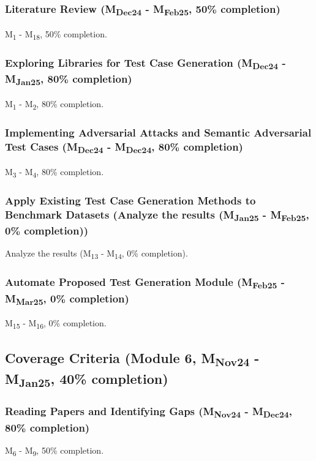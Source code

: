 \subsubsection{Literature Review (M\textsubscript{Dec24} - M\textsubscript{Feb25}, 50\% completion)}
M\textsubscript{1} - M\textsubscript{18}, 50\% completion.

\subsubsection{Exploring Libraries for Test Case Generation (M\textsubscript{Dec24} - M\textsubscript{Jan25}, 80\% completion)}
M\textsubscript{1} - M\textsubscript{2}, 80\% completion.

\subsubsection{Implementing Adversarial Attacks and Semantic Adversarial Test Cases (M\textsubscript{Dec24} - M\textsubscript{Dec24}, 80\% completion)}
M\textsubscript{3} - M\textsubscript{4}, 80\% completion.
\subsubsection{Apply Existing Test Case Generation Methods to Benchmark Datasets (Analyze the results (M\textsubscript{Jan25} - M\textsubscript{Feb25}, 0\% completion))}
Analyze the results (M\textsubscript{13} - M\textsubscript{14}, 0\% completion).

\subsubsection{Automate Proposed Test Generation Module (M\textsubscript{Feb25} - M\textsubscript{Mar25}, 0\% completion)}
M\textsubscript{15} - M\textsubscript{16}, 0\% completion.


\subsection{Coverage Criteria (Module 6, M\textsubscript{Nov24} - M\textsubscript{Jan25}, 40\% completion)}
\subsubsection{Reading Papers and Identifying Gaps (M\textsubscript{Nov24} - M\textsubscript{Dec24}, 80\% completion)}
M\textsubscript{6} - M\textsubscript{9}, 50\% completion.

